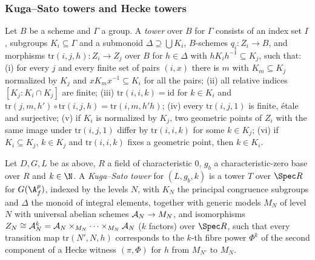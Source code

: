 \subsubsection{Kuga--Sato towers and Hecke towers}

\begin{definition}[Towers]\label{pf:ks2:def:tower}
Let $B$ be a scheme and $\Gamma$ a group. A \emph{tower} over $B$ for $\Gamma$ consists of an index set $I$, subgroups $K_i\subseteq\Gamma$
and a submonoid $\Delta\supseteq\bigcup K_i$, $B$-schemes $q_i\colon Z_i\to B$, and morphisms
$\mathrm{tr}(i,j,h)\colon Z_i\to Z_j$ over $B$ for $h\in\Delta$ with $hK_ih^{-1}\subseteq K_j$,
such that: (i) for every $j$ and every finite set of pairs $(i,x)$ there is $m$ with
$K_m\subseteq K_j$ normalized by $K_j$ and $xK_mx^{-1}\subseteq K_i$ for all the pairs;
(ii) all relative indices $[K_j:K_i\cap K_j]$ are finite; (iii) $\mathrm{tr}(i,i,k)=\mathrm{id}$ for
$k\in K_i$ and $\mathrm{tr}(j,m,h')\circ\mathrm{tr}(i,j,h)=\mathrm{tr}(i,m,h'h)$; (iv) every
$\mathrm{tr}(i,j,1)$ is finite, \'etale and surjective; (v) if $K_i$ is normalized by $K_j$, two
geometric points of $Z_i$ with the same image under $\mathrm{tr}(i,j,1)$ differ by
$\mathrm{tr}(i,i,k)$ for some $k\in K_j$; (vi) if $K_i\subseteq K_j$, $k\in K_j$ and
$\mathrm{tr}(i,i,k)$ fixes a geometric point, then $k\in K_i$.
\end{definition}

\begin{definition}\label{pf:ks2:def:ks}
Let $D,G,L$ be as above, $R$ a field of characteristic $0$, $g_b$ a characteristic-zero base over
$R$ and $k\in\N$. A \emph{Kuga--Sato tower} for $(L,g_b,k)$
is a tower $T$ over $\Spec R$ for $\kstwoG$, indexed by the levels $N$, with $K_N$ the principal
congruence subgroups and $\Delta$ the monoid of integral elements, together with generic models
$M_N$ of level $N$ with universal abelian schemes $\mathcal{A}_N\to M_N$, and isomorphisms
$Z_N\cong\mathcal{A}_N^k=\mathcal{A}_N\times_{M_N}\dots\times_{M_N}\mathcal{A}_N$ ($k$ factors) over
$\Spec R$, such that every transition map $\mathrm{tr}(N',N,h)$ corresponds to the $k$-th fibre
power $\Phi^{k}$ of the second component of a Hecke witness $(\pi,\Phi)$ for $h$ from $M_{N'}$
to $M_N$.
\end{definition}

